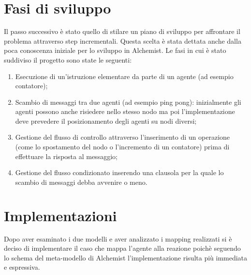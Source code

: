 \documentclass[12pt,a4paper,openright,twoside]{report}
\begin{document}
\section{Fasi di sviluppo}
Il passo successivo \`e stato quello di stilare un piano di sviluppo per affrontare il problema attraverso step incrementali. Questa scelta \`e stata dettata anche dalla poca conoscenza iniziale per lo sviluppo in Alchemist. Le fasi in cui \`e stato suddiviso il progetto sono state le seguenti:
\begin{enumerate}
\item Esecuzione di un'istruzione elementare da parte di un agente (ad esempio contatore);
\item Scambio di messaggi tra due agenti (ad esempio ping pong): inizialmente gli agenti possono anche risiedere nello stesso nodo ma poi l'implementazione deve prevedere il posizionamento degli agenti su nodi diversi;
\item Gestione del flusso di controllo attraverso l'inserimento di un operazione (come lo spostamento del nodo o l'incremento di un contatore) prima di effettuare la risposta al messaggio;
\item Gestione del flusso condizionato inserendo una clausola per la quale lo scambio di messaggi debba avvenire o meno.
\end{enumerate}


\section{Implementazioni}

Dopo aver esaminato i due modelli e aver analizzato i mapping realizzati si \`e deciso di implementare il caso che mappa l'agente alla reazione poich\`e seguendo lo schema del meta-modello di Alchemist l'implementazione risulta pi\`u immediata e espressiva.
\end{document}
